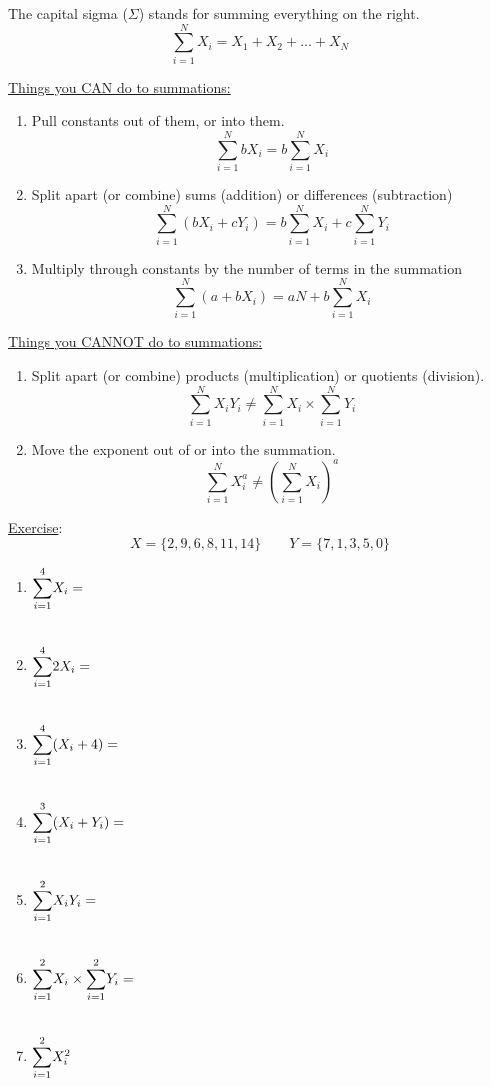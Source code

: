 \documentclass{./../../Latex/handout}
\begin{document}
\thispagestyle{plain}
\begin{center}
\end{center}	

The capital sigma ($\Sigma$) stands for summing everything on the right. 
$$ \sum_{i=1}^N X_i = X_1 + X_2 + ... + X_N $$

\underline{Things you CAN do to summations:}
\begin{enumerate}
\item Pull constants out of them, or into them.
$$ \sum_{i=1}^N b X_i = b \sum_{i=1}^N X_i  $$
\item Split apart (or combine) sums (addition) or differences (subtraction)
$$ \sum_{i=1}^N (b X_i + c Y_i) = b \sum_{i=1}^N X_i  + c \sum_{i=1}^N Y_i $$
\item Multiply through constants by the number of terms in the summation
$$ \sum_{i=1}^N (a+b X_i)= aN + b \sum_{i=1}^N X_i  $$
\end{enumerate}

\underline{Things you CANNOT do to summations:}
\begin{enumerate}
\item Split apart (or combine) products (multiplication) or quotients (division).
$$ \sum_{i=1}^N X_i Y_i \neq  \sum_{i=1}^N X_i \times \sum_{i=1}^N Y_i   $$
\item Move the exponent out of or into the summation.
$$ \sum_{i=1}^N X_i^a \neq  \left(\sum_{i=1}^N X_i\right)^a $$
\end{enumerate}

\underline{Exercise}:
$$ X = \{2,9,6,8,11,14\} \quad \quad Y = \{7,1,3,5,0\}$$ 
\begin{enumerate}
\item $\mathlarger{\sum}_{i=1}^4 X_i = $ \\~\\
\item $\mathlarger{\sum}_{i=1}^4 2 X_i = $ \\~\\
\item $\mathlarger{\sum}_{i=1}^4 (X_i+4) = $ \\~\\
\item $\mathlarger{\sum}_{i=1}^3 (X_i+Y_i) = $ \\~\\
\item $\mathlarger{\sum}_{i=1}^2 X_i Y_i = $ \\~\\
\item $\mathlarger{\sum}_{i=1}^2 X_i \times \mathlarger{\sum}_{i=1}^2 Y_i = $ \\~\\
\item $\mathlarger{\sum}_{i=1}^2 X_i^2 $ \\~\\
\end{enumerate}
\end{document}
